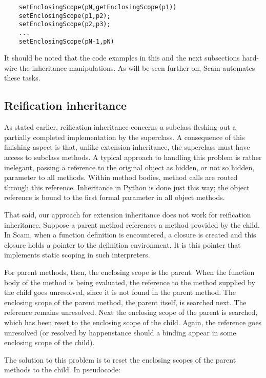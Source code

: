 \begin{verbatim}
    setEnclosingScope(pN,getEnclosingScope(p1))
    setEnclosingScope(p1,p2);
    setEnclosingScope(p2,p3);
    ...
    setEnclosingScope(pN-1,pN)
\end{verbatim}

It should be noted that the code examples in this and the next subsections
hard-wire the inheritance manipulations. As will be seen further on,
Scam automates these tasks.

\subsection{Reification inheritance}

As stated earlier, reification inheritance concerns a subclass fleshing
out a partially completed implementation by the superclass. A consequence
of this finishing aspect is that, unlike extension inheritance, the
superclass must have access to subclass methods.  A typical approach
to handling this problem is rather inelegant, passing a reference to
the original object as hidden, or not so hidden,
parameter to all methods.  Within method
bodies, method calls are routed through this reference. Inheritance in
Python is done just this way; the object reference is bound to the
first formal parameter in all object methods.

That said, our approach for extension inheritance
does not work for reification inheritance. Suppose a parent method
references a method provided by the child. In Scam,
when a function definition is encountered, a closure is
created and this closure holds a pointer to the definition environment. It
is this pointer that implements static scoping in such interpreters.

For parent methods, then, the enclosing scope is the parent.  When the
function body of the method is being evaluated, the reference to the
method supplied by the child goes unresolved, since it is not found in
the parent method. The enclosing scope of the parent method, the parent
itself, is searched next.  The reference remains unresolved. Next the
enclosing scope of the parent is searched, which has been reset to the
enclosing scope of the child. Again, the reference goes unresolved (or
resolved by happenstance should a binding appear in some enclosing scope
of the child).

The solution to this problem is to reset the enclosing scopes of the
parent methods to the child. In pseudocode:

